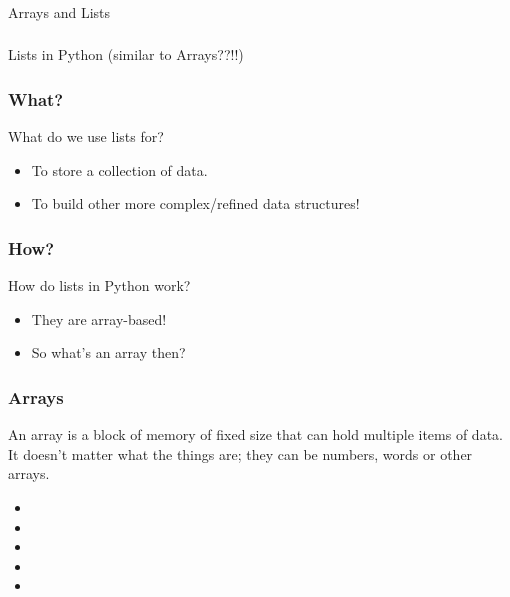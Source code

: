 \begin{frame}[fragile]\frametitle{}
\begin{center}
{\Large Arrays and Lists}
\end{center}

\end{frame}

\begin{frame}[fragile]\frametitle{}
\begin{center}
{\Large Lists in Python (similar to Arrays??!!)}
\end{center}

\end{frame}

\begin{frame}
	\frametitle{What?}
		What do we use lists for?	

		\begin{itemize}
			\item To store a collection of data.
			\item To build other more complex/refined data structures!
		\end{itemize}
\end{frame}

\begin{frame}
	\frametitle{How?}
		How do lists in Python work?

		\begin{itemize}
			\item 		They are array-based!
			\item   	So what's an array then?
	\end{itemize}
\end{frame}




\begin{frame}
	\frametitle{Arrays}
		An array is a block of memory of fixed size that can hold multiple items of data.
It doesn’t matter what the things are; they can be numbers, 
words or other arrays.

	

			\begin{itemize}
			\item 	
			\item
			\item 	
			\item
			\item 	
	\end{itemize}


\end{frame}

